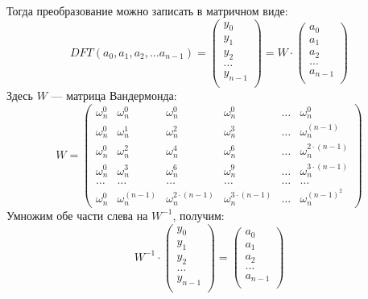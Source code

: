 Тогда преобразование можно записать в матричном виде:
$$ DFT(a_0, a_1, a_2, \dots a_{n - 1}) =
\begin{pmatrix}
y_0 \\
y_1 \\
y_2 \\
\dots \\
y_{n - 1} \\
\end{pmatrix}
= W \cdot
\begin{pmatrix}
a_0 \\
a_1 \\
a_2 \\
\dots \\
a_{n - 1} \\
\end{pmatrix}
$$
Здесь $W$ --- матрица Вандермонда:
$$ W =
\begin{pmatrix}
{\omega}_{n} ^ {0} & {\omega}_{n} ^ {0} & {\omega}_{n} ^ {0} & {\omega}_{n} ^ {0} & \dots & {\omega}_{n} ^ {0} \\
{\omega}_{n} ^ {0} & {\omega}_{n} ^ {1} & {\omega}_{n} ^ {2} & {\omega}_{n} ^ {3} & \dots & {\omega}_{n} ^ {(n - 1)} \\
{\omega}_{n} ^ {0} & {\omega}_{n} ^ {2} & {\omega}_{n} ^ {4} & {\omega}_{n} ^ {6} & \dots & {\omega}_{n} ^ {2 \cdot (n - 1)} \\
{\omega}_{n} ^ {0} & {\omega}_{n} ^ {3} & {\omega}_{n} ^ {6} & {\omega}_{n} ^ {9} & \dots & {\omega}_{n} ^ {3 \cdot (n - 1)} \\
\dots & \dots & \dots & \dots & \dots & \dots \\
{\omega}_{n} ^ {0} & {\omega}_{n} ^ {(n - 1)} & {\omega}_{n} ^ {2 \cdot (n - 1)} & {\omega}_{n} ^ {3 \cdot (n - 1)} & \dots & {\omega}_{n} ^ {(n - 1) ^ 2}
\end{pmatrix}
$$
Умножим обе части слева на $W^{-1}$, получим:
$$
W^{-1} \cdot
\begin{pmatrix}
y_0 \\
y_1 \\
y_2 \\
\dots \\
y_{n - 1} \\
\end{pmatrix}
=
\begin{pmatrix}
a_0 \\
a_1 \\
a_2 \\
\dots \\
a_{n - 1} \\
\end{pmatrix}
$$
